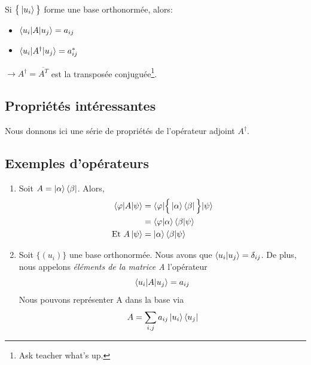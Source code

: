 \documentclass[../notesdecours.tex]{subfiles}
\begin{document}
Si $\big\{\ket{u_i}\big\}$ forme une base orthonormée, alors:
\begin{itemize}
\item $\braket{u_i|A|u_j} = a_{ij}$
\item $\braket{u_i|A^\dag|u_j} = a^*_{ij}$
\end{itemize}
$\rightarrow A^\dag = \overline{A^T}$ est la transposée conjuguée\footnote{Ask teacher what's up.}.\\
\subsection{Propriétés intéressantes}
Nous donnons ici une série de propriétés de l'opérateur adjoint $A^\dag$.
\begin{center}
\end{center}

\subsection{Exemples d'opérateurs}
\begin{enumerate}
\item Soit $A=\ket{\alpha}\bra{\beta}$. Alors,
\begin{align}
\braket{\varphi|A|\psi} &= \braket{\varphi|\Big\{\ket{\alpha}\bra{\beta}\Big\}|\psi}\\
&= \braket{\varphi|\alpha}\braket{\beta|\psi}\\
\text{Et } A\ket{\psi} &= \ket{\alpha}\braket{\beta|\psi}
\end{align}
\item Soit $\Big\{(u_i)\Big\}$ une base orthonormée. Nous avons que $\braket{u_i|u_j} = \delta_{ij}$. De plus, nous appelons \emph{éléments de la matrice A} l'opérateur
\begin{equation}
\braket{u_i|A|u_j} = a_{ij}
\end{equation}
Nous pouvons représenter A dans la base via
\begin{equation}
A = \sum_{i,j} a_{ij} \ket{u_i}\bra{u_j}
\end{equation}
\end{enumerate}
\end{document}
